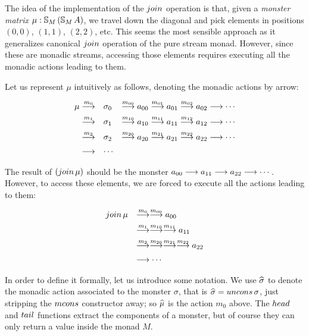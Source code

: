 The idea of the implementation of the $\join$ operation is that,
given a {\em monster matrix} $\mu:\mathbb{S}_{M}\,(\mathbb{S}_{M}\,A)$, we travel down the diagonal and pick elements in positions $(0,0)$, $(1,1)$, $(2,2)$, etc.
This seems the most sensible approach as it generalizes canonical $\join$ operation of the pure stream monad.
However, since these are monadic streams, accessing those elements requires executing all the monadic actions leading to them.

Let us represent $\mu$ intuitively as follows, denoting the monadic actions by arrow:

$$
\begin{array}[t]{rll}
\mu \stackrel{m_0}{\longrightarrow} 
 & \sigma_0 
 & \stackrel{m_{00}}{\longrightarrow} a_{00} \stackrel{m_{01}}{\longrightarrow} a_{01} \stackrel{m_{02}}{\longrightarrow} a_{02} \stackrel{}{\longrightarrow} \cdots\\[5pt]
\stackrel{m_1}{\longrightarrow} 
 & \sigma_1 
 & \stackrel{m_{10}}{\longrightarrow} a_{10} \stackrel{m_{11}}{\longrightarrow} a_{11} \stackrel{m_{12}}{\longrightarrow} a_{12} \stackrel{}{\longrightarrow} \cdots\\[5pt]
\stackrel{m_2}{\longrightarrow} 
 & \sigma_2
 & \stackrel{m_{20}}{\longrightarrow} a_{20} \stackrel{m_{21}}{\longrightarrow} a_{21} \stackrel{m_{22}}{\longrightarrow} a_{22} \stackrel{}{\longrightarrow} \cdots\\[5pt]
\stackrel{}{\longrightarrow} & \cdots
\end{array}
$$

The result of $(\join\,\mu)$ should be the monster $a_{00} \stackrel{}{\longrightarrow} a_{11}\stackrel{}{\longrightarrow} a_{22} \stackrel{}{\longrightarrow} \cdots$.
However, to access these elements, we are forced to execute all the actions leading to them:

$$
\begin{array}{ll}
\join\,\mu 
& \larrow{m_0}\larrow{m_{00}} a_{00}\\[5pt]
& \larrow{m_1}\larrow{m_{10}}\larrow{m_{11}} a_{11}\\[5pt]
& \larrow{m_2}\larrow{m_{20}}\larrow{m_{21}}\larrow{m_{22}} a_{22}\\[5pt]
& \larrow{} \cdots
\end{array}
$$

In order to define it formally, let us introduce some notation.
We use $\widehat{\sigma}$ to denote the monadic action associated to the monster $\sigma$, that is $ \unc{\sigma} = \uncons\,\sigma $, just stripping the $\mcons$ constructor away; so $\widehat{\mu}$ is the action $m_0$ above.
The $\head$ and $\tail$ functions extract the components of a monster, but of course they can only return a value inside the monad $M$.

